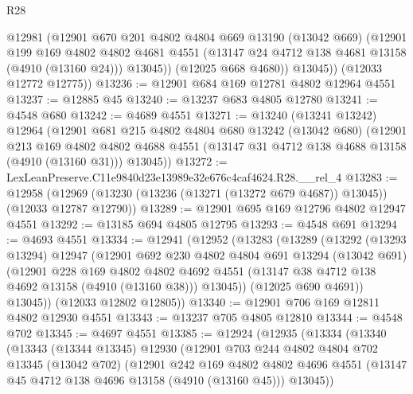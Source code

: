 \begin{lexlean}{R28}
\begin{coremodule}
            @12981
            (@12901
              @670
              @201
              @4802
              @4804
              @669
              @13190
              (@13042 @669)
              (@12901
                @199
                @169
                @4802
                @4802
                @4681
                @4551
                (@13147 @24 @4712 @138 @4681 @13158 (@4910 (@13160 @24)))
                @13045))
            (@12025 @668 @4680))
          @13045))
      (@12033 @12772 @12775))
@13236 := @12901 @684 @169 @12781 @4802 @12964 @4551
@13237 := @12885 @45
@13240 := @13237 @683 @4805 @12780
@13241 := @4548 @680
@13242 := @4689 @4551
@13271 := @13240
    (@13241 @13242)
    @12964
    (@12901
      @681
      @215
      @4802
      @4804
      @680
      @13242
      (@13042 @680)
      (@12901
        @213
        @169
        @4802
        @4802
        @4688
        @4551
        (@13147 @31 @4712 @138 @4688 @13158 (@4910 (@13160 @31)))
        @13045))
@13272 := LexLeanPreserve.C11e9840d23e13989e32e676c4caf4624.R28.__rel_4
@13283 := @12958
    (@12969 (@13230 (@13236 (@13271 (@13272 @679 @4687)) @13045)) (@12033 @12787 @12790))
@13289 := @12901 @695 @169 @12796 @4802 @12947 @4551
@13292 := @13185 @694 @4805 @12795
@13293 := @4548 @691
@13294 := @4693 @4551
@13334 := @12941
    (@12952
      (@13283
        (@13289
          (@13292
            (@13293 @13294)
            @12947
            (@12901
              @692
              @230
              @4802
              @4804
              @691
              @13294
              (@13042 @691)
              (@12901
                @228
                @169
                @4802
                @4802
                @4692
                @4551
                (@13147 @38 @4712 @138 @4692 @13158 (@4910 (@13160 @38)))
                @13045))
            (@12025 @690 @4691))
          @13045))
      (@12033 @12802 @12805))
@13340 := @12901 @706 @169 @12811 @4802 @12930 @4551
@13343 := @13237 @705 @4805 @12810
@13344 := @4548 @702
@13345 := @4697 @4551
@13385 := @12924
    (@12935
      (@13334
        (@13340
          (@13343
            (@13344 @13345)
            @12930
            (@12901
              @703
              @244
              @4802
              @4804
              @702
              @13345
              (@13042 @702)
              (@12901
                @242
                @169
                @4802
                @4802
                @4696
                @4551
                (@13147 @45 @4712 @138 @4696 @13158 (@4910 (@13160 @45)))
                @13045))

\end{coremodule}
\end{lexlean}

